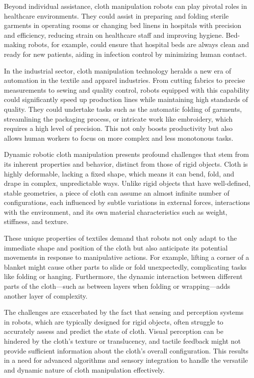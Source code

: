 \documentclass[subscriptcorrection,upint,varvw,barcolor=Goldenrod3,mathalfa=cal=euler,balance,hyphenate,french,pdf-a, nofoot]{asmejour} %
\begin{document}
Beyond individual assistance, cloth manipulation robots can play pivotal roles in healthcare environments. They could assist in preparing and folding sterile garments in operating rooms or changing bed linens in hospitals with precision and efficiency, reducing strain on healthcare staff and improving hygiene\cite{seita2019deep}. Bed-making robots, for example, could ensure that hospital beds are always clean and ready for new patients, aiding in infection control by minimizing human contact.

In the industrial sector, cloth manipulation technology heralds a new era of automation in the textile and apparel industries. From cutting fabrics to precise measurements to sewing and quality control, robots equipped with this capability could significantly speed up production lines while maintaining high standards of quality\cite{torgerson1988vision}. They could undertake tasks such as the automatic folding of garments, streamlining the packaging process, or intricate work like embroidery, which requires a high level of precision. This not only boosts productivity but also allows human workers to focus on more complex and less monotonous tasks.

Dynamic robotic cloth manipulation presents profound challenges that stem from its inherent properties and behavior, distinct from those of rigid objects. Cloth is highly deformable, lacking a fixed shape, which means it can bend, fold, and drape in complex, unpredictable ways\cite{borras2020grasping, sanchez2018robotic}. Unlike rigid objects that have well-defined, stable geometries, a piece of cloth can assume an almost infinite number of configurations, each influenced by subtle variations in external forces, interactions with the environment, and its own material characteristics such as weight, stiffness, and texture.

These unique properties of textiles demand that robots not only adapt to the immediate shape and position of the cloth but also anticipate its potential movements in response to manipulative actions. For example, lifting a corner of a blanket might cause other parts to slide or fold unexpectedly, complicating tasks like folding or hanging. Furthermore, the dynamic interaction between different parts of the cloth—such as between layers when folding or wrapping—adds another layer of complexity.

The challenges are exacerbated by the fact that sensing and perception systems in robots, which are typically designed for rigid objects, often struggle to accurately assess and predict the state of cloth. Visual perception can be hindered by the cloth's texture or translucency, and tactile feedback might not provide sufficient information about the cloth's overall configuration\cite{tirumala2022learning}. This results in a need for advanced algorithms and sensory integration to handle the versatile and dynamic nature of cloth manipulation effectively.
\end{document}
